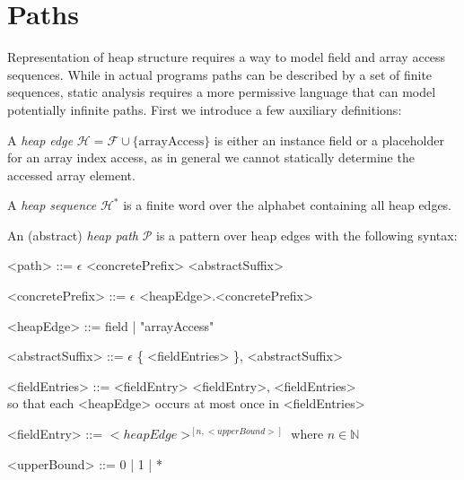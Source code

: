 \section{Paths}
Representation of heap structure requires a way to model field and array access sequences. While in actual programs paths can be described by a set of finite sequences, static analysis requires a more permissive language that can model potentially infinite paths. First we introduce a few auxiliary definitions:
\begin{definition}
A \emph{heap edge} $\mathcal{H} = \mathcal{F} \cup \{ \text{arrayAccess} \}$ is either an instance field or a placeholder for an array index access, as in general we cannot statically determine the accessed array element.
\end{definition}
\begin{definition}
A \emph{heap sequence} $\mathcal{H}^*$ is a finite word over the alphabet containing all heap edges.
\end{definition}
\begin{definition}
\label{def:path}
An (abstract) \emph{heap path} $\mathcal{P}$ is a pattern over heap edges with the following syntax:
\grammarindent=120pt
\begin{grammar}
<path> ::= $\epsilon$
\alt <concretePrefix> <abstractSuffix>

<concretePrefix> ::= $\epsilon$
\alt <heapEdge>.<concretePrefix>

<heapEdge> ::= field | "arrayAccess"

<abstractSuffix> ::= $\epsilon$
\alt \{ <fieldEntries> \}, <abstractSuffix>

<fieldEntries> ::= <fieldEntry> 
    \alt <fieldEntry>, <fieldEntries> \\ so that each <heapEdge> occurs at most once in <fieldEntries>

<fieldEntry> ::= $<heapEdge>^{\left[n, <upperBound>\right]}$ where $n \in \mathbb{N}$

<upperBound> ::= 0 | 1 | *
\end{grammar}
\end{definition}


